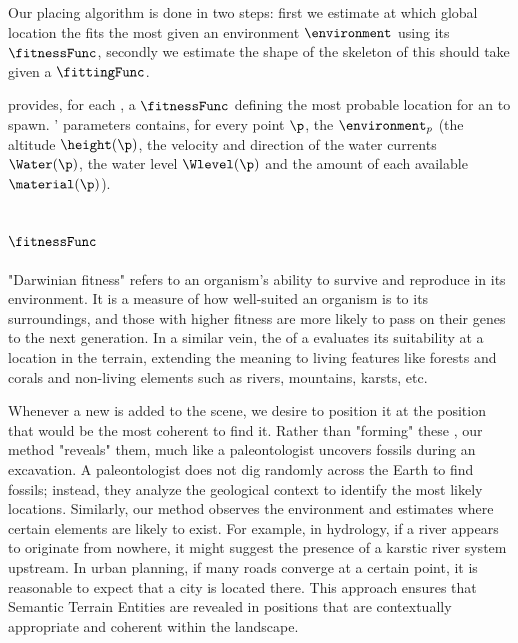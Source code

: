 Our placing algorithm is done in two steps: first we estimate at which global location the  fits the most given an environment $\environment$ using its  $\fitnessFunc$, secondly we estimate the shape of the skeleton of this  should take given a  $\fittingFunc$.

 provides, for each , a  $\fitnessFunc$ defining the most probable location for an  to spawn. ' parameters contains, for every point $\p$, the  $\environment_p$ (the altitude $\height(\p)$, the velocity and direction of the water currents $\Water(\p)$, the water level $\Wlevel(\p)$ and the amount of each  available $\material(\p)$).

\subsection{ $\fitnessFunc$}
"Darwinian fitness" refers to an organism's ability to survive and reproduce in its environment. It is a measure of how well-suited an organism is to its surroundings, and those with higher fitness are more likely to pass on their genes to the next generation. In a similar vein, the  of a  evaluates its suitability at a location in the terrain, extending the meaning to living features like forests and corals and non-living elements such as rivers, mountains, karsts, etc.

Whenever a new  is added to the scene, we desire to position it at the position that would be the most coherent to find it. Rather than "forming" these , our method "reveals" them, much like a paleontologist uncovers fossils during an excavation. A paleontologist does not dig randomly across the Earth to find fossils; instead, they analyze the geological context to identify the most likely locations. Similarly, our method observes the environment and estimates where certain elements are likely to exist. For example, in hydrology, if a river appears to originate from nowhere, it might suggest the presence of a karstic river system upstream. In urban planning, if many roads converge at a certain point, it is reasonable to expect that a city is located there. This approach ensures that Semantic Terrain Entities are revealed in positions that are contextually appropriate and coherent within the landscape.

